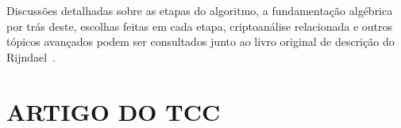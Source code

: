 \documentclass{ufsctex/ufsctex}
\begin{document}
Discussões detalhadas sobre as etapas do algoritmo, a fundamentação algébrica
por trás deste, escolhas feitas em cada etapa, criptoanálise relacionada e
outros tópicos avançados podem ser consultados junto ao livro original de
descrição do Rijndael~\cite{Daemen:book:2002}.

\chapter{ARTIGO DO TCC}\label{chapter:paper}


\end{document}

